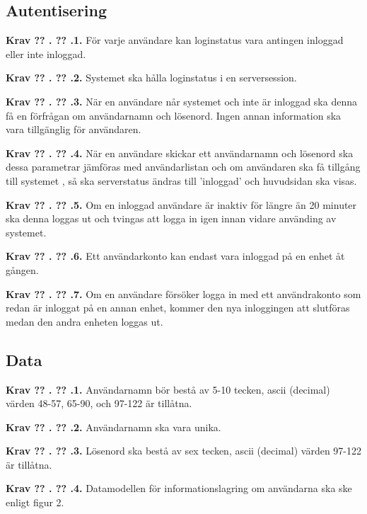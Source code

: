 \documentclass[a4paper]{article}
\newcommand\getcurrentref[1]{%
 \ifnumequal{\value{#1}}{0}
  {??}
  {\the\value{#1}}%
}
\newcommand\requirement[2]{
	\numberedrow{Krav}{#1}{#2}
}
\newcommand\numberedrow[3]{
	\noindent
	\textbf{#1 \getcurrentref{section}.\getcurrentref{subsection}.#2.} #3
	
}
\begin{document}
\subsection{Autentisering}
\requirement{1}{För varje användare kan loginstatus vara antingen inloggad eller inte inloggad.}
\requirement{2}{Systemet ska hålla loginstatus i en serversession.}
\requirement{3}{När en användare når systemet och inte är inloggad ska denna få en förfrågan om användarnamn och lösenord. Ingen annan information ska vara tillgänglig för användaren.}
\requirement{4}{När en användare skickar ett användarnamn och lösenord ska dessa parametrar jämföras med användarlistan och om användaren ska få tillgång till systemet , så ska serverstatus ändras till 'inloggad' och huvudsidan ska visas.}
\requirement{5}{Om en inloggad användare är inaktiv för längre än 20 minuter ska denna loggas ut och tvingas att logga in igen innan vidare använding av systemet.}
\requirement{6}{Ett användarkonto kan endast vara inloggad på en enhet åt gången.}
\requirement{7}{Om en användare försöker logga in med ett användrakonto som redan är inloggat på en annan enhet, kommer den nya inloggingen att slutföras medan den andra enheten loggas ut.}

\subsection{Data}
\label{krav-funk-data}
\requirement{1}{Användarnamn bör bestå av 5-10 tecken, ascii (decimal) värden 48-57, 65-90, och 97-122 är tillåtna.}
\requirement{2}{Användarnamn ska vara unika.}
\requirement{3}{Lösenord ska bestå av sex tecken, ascii (decimal) värden 97-122 är tillåtna.}

\requirement{4}{Datamodellen för informationslagring om användarna ska ske enligt figur 2.
}
\end{document}
